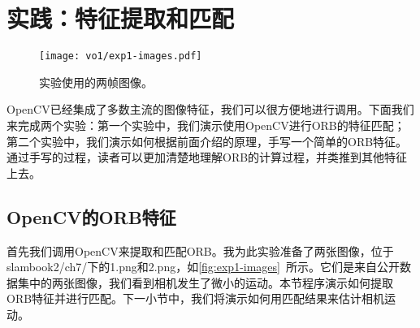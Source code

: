 \section{实践：特征提取和匹配}
\begin{figure}[!htp]
	\centering
	\texttt{[image: vo1/exp1-images.pdf]}
	\caption{实验使用的两帧图像。}
	\label{fig:exp1-images}
\end{figure}

OpenCV已经集成了多数主流的图像特征，我们可以很方便地进行调用。下面我们来完成两个实验：第一个实验中，我们演示使用OpenCV进行ORB的特征匹配；第二个实验中，我们演示如何根据前面介绍的原理，手写一个简单的ORB特征。通过手写的过程，读者可以更加清楚地理解ORB的计算过程，并类推到其他特征上去。

\subsection{OpenCV的ORB特征}
首先我们调用OpenCV来提取和匹配ORB。我为此实验准备了两张图像，位于slambook2/ch7/下的1.png和2.png，如\autoref{fig:exp1-images}~所示。它们是来自公开数据集\cite{Sturm2012}中的两张图像，我们看到相机发生了微小的运动。本节程序演示如何提取ORB特征并进行匹配。下一小节中，我们将演示如何用匹配结果来估计相机运动。

